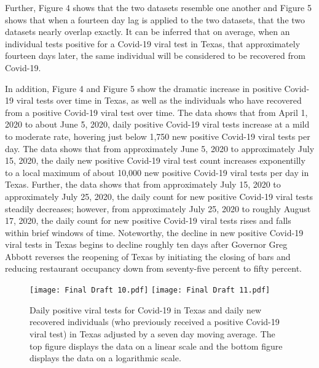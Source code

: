 \documentclass{article}
\begin{document}
\vspace{2mm}

Further, Figure 4  shows that the two datasets resemble one another and Figure 5 shows that when a fourteen day lag is applied to the two datasets, that the two datasets nearly overlap exactly. It can be inferred that on average, when an individual tests positive for a Covid-19 viral test in Texas, that approximately fourteen days later, the same individual will be considered to be recovered from Covid-19. 

In addition, Figure 4 and Figure 5 show the dramatic increase in positive Covid-19 viral tests over time in Texas, as well as the individuals who have recovered from a positive Covid-19 viral test over time. The data shows that from April 1, 2020 to about June 5, 2020, daily positive Covid-19 viral tests increase at a mild to moderate rate, hovering just below 1,750 new positive Covid-19 viral tests per day. The data shows that from approximately June 5, 2020 to approximately July 15, 2020, the daily new positive Covid-19 viral test count increases exponentilly to a local maximum of about 10,000 new positive Covid-19 viral tests per day in Texas. Further, the data shows that from approximately July 15, 2020 to approximately July 25, 2020, the daily count for new positive Covid-19 viral tests steadily decreases; however, from approximately July 25, 2020 to roughly August 17, 2020, the daily count for new positive Covid-19 viral tests rises and falls within brief windows of time. Noteworthy, the decline in new positive Covid-19 viral tests in Texas begins to decline roughly ten days after Governor Greg Abbott reverses the reopening of Texas by initiating the closing of bars and reducing restaurant occupancy down from seventy-five percent to fifty percent. 


\begin{figure}[!htbp]
	\begin{center}
		\texttt{[image: Final Draft 10.pdf]}
		\vspace{1mm}
		\texttt{[image: Final Draft 11.pdf]}
		\caption{Daily positive viral tests for Covid-19 in Texas and daily new recovered individuals (who previously received a positive Covid-19 viral test) in Texas adjusted by a seven day moving average. The top figure displays the data on a linear scale and the bottom figure displays the data on a logarithmic scale. }
		\label{fig:1}
	\end{center}
\end{figure}
\end{document}
